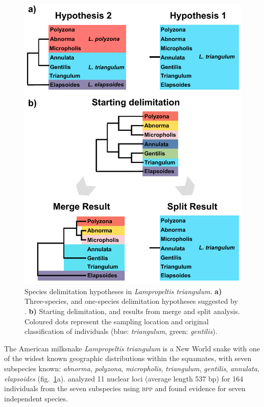 \documentclass[A4]{article1}
\begin{document}
\begin{figure}
    \includegraphics[scale=0.18]{figs/fig-miksnakes-results} %
    
    \caption{Species delimitation hypotheses in \textit{Lampropeltis triangulum}.
    \textbf{a)} Three-species, and one-species delimitation hypotheses suggested by
    \citet{Chambers2020}.  \textbf{b)} Starting delimitation, and results from merge and
    split analysis. \\ %
    Coloured dots represent the sampling location and original classification of
    individuals (blue: \textit{triangulum}, green: \textit{gentilis}). %
} \label{fig:milksnake}
\end{figure} 

The  American milksnake \textit{Lampropeltis triangulum} is a New World snake with one of
the widest known geographic distributions within the squamates, with seven subspecies
known: \textit{abnorma}, \textit{polyzona}, \textit{micropholis}, \textit{triangulum},
\textit{gentilis}, \textit{annulata}, \textit{elapsoides} (fig.~\ref{fig:milksnake}a).  
\citet{Ruane2014} analyzed 11 nuclear loci (average length 537 bp) for 164 individuals
from the seven subspecies using \textsc{bpp} and found evidence for seven independent
species. 
\end{document}
